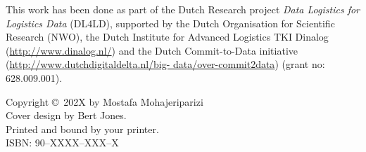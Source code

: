 {%
%


\noindent 
This work has been done as part of the Dutch Research project \textit{Data Logistics for Logistics Data} (DL4LD), supported by the Dutch Organisation for Scientific Research (NWO), the Dutch Institute for Advanced Logistics TKI Dinalog (\url{http://www.dinalog.nl/}) and the Dutch Commit-to-Data initiative (\url{http://www.dutchdigitaldelta.nl/big- data/over-commit2data}) (grant no: 628.009.001).
\par\vspace {2cm}

%

%
\noindent%
Copyright \copyright\ 202X by Mostafa Mohajeriparizi\\[2ex] %
Cover design by Bert Jones.\\                       %
Printed and bound by your printer.\\[2ex]           %
ISBN: 90--XXXX--XXX--X                              %



}
